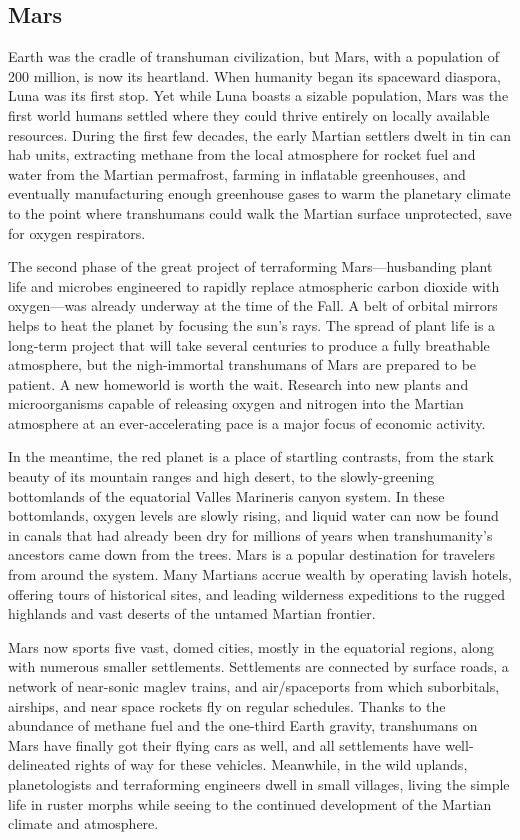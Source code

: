 \subsection{Mars} \label{sec:mars} 

Earth was the cradle of transhuman civilization, but Mars, with a population of 200 million, is now its heartland. When humanity began its spaceward diaspora, Luna was its first stop. Yet while Luna boasts a sizable population, Mars was the first world humans settled where they could thrive entirely on locally available resources. During the first few decades, the early Martian settlers dwelt in tin can hab units, extracting methane from the local atmosphere for rocket fuel and water from the Martian permafrost, farming in inflatable greenhouses, and eventually manufacturing enough greenhouse gases to warm the planetary climate to the point where transhumans could walk the Martian surface unprotected, save for oxygen respirators. 

The second phase of the great project of terraforming Mars—husbanding plant life and microbes engineered to rapidly replace atmospheric carbon dioxide with oxygen—was already underway at the time of the Fall. A belt of orbital mirrors helps to heat the planet by focusing the sun's rays. The spread of plant life is a long-term project that will take several centuries to produce a fully breathable atmosphere, but the nigh-immortal transhumans of Mars are prepared to be patient. A new homeworld is worth the wait. Research into new plants and microorganisms capable of releasing oxygen and nitrogen into the Martian atmosphere at an ever-accelerating pace is a major focus of economic activity. 

In the meantime, the red planet is a place of startling contrasts, from the stark beauty of its mountain ranges and high desert, to the slowly-greening bottomlands of the equatorial Valles Marineris canyon system. In these bottomlands, oxygen levels are slowly rising, and liquid water can now be found in canals that had already been dry for millions of years when transhumanity's ancestors came down from the trees. Mars is a popular destination for travelers from around the system. Many Martians accrue wealth by operating lavish hotels, offering tours of historical sites, and leading wilderness expeditions to the rugged highlands and vast deserts of the untamed Martian frontier. 

Mars now sports five vast, domed cities, mostly in the equatorial regions, along with numerous smaller settlements. Settlements are connected by surface roads, a network of near-sonic maglev trains, and air/spaceports from which suborbitals, airships, and near space rockets fly on regular schedules. Thanks to the abundance of methane fuel and the one-third Earth gravity, transhumans on Mars have finally got their flying cars as well, and all settlements have well-delineated rights of way for these vehicles. Meanwhile, in the wild uplands, planetologists and terraforming engineers dwell in small villages, living the simple life in ruster morphs while seeing to the continued development of the Martian climate and atmosphere. 

